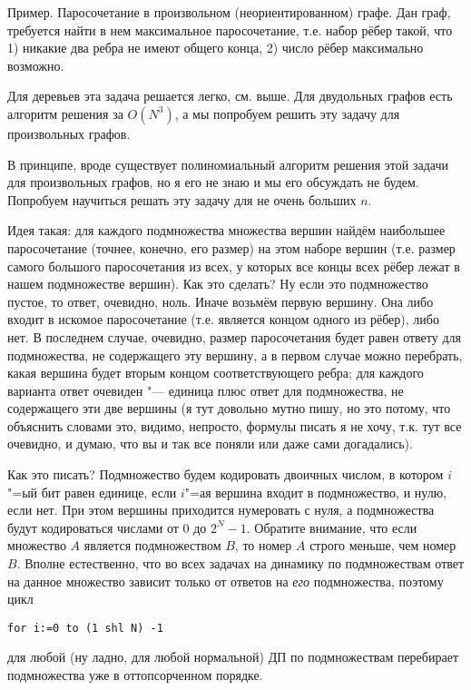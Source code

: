 Пример. Паросочетание в произвольном (неориентированном) графе. Дан граф, требуется найти в нем
максимальное паросочетание, т.е. набор рёбер такой, что 1) никакие два ребра не имеют общего конца, 2) число
рёбер максимально возможно.

Для деревьев эта задача решается легко, см. выше. Для двудольных графов есть алгоритм решения за $O(N^3)$, а мы попробуем решить эту задачу для произвольных графов.

В принципе, вроде существует полиномиальный алгоритм решения этой задачи для произвольных графов, но я его не знаю и мы его обсуждать не будем. Попробуем научиться
решать эту задачу для не очень больших $n$.

Идея такая: для каждого подмножества множества вершин найдём наибольшее паросочетание (точнее, конечно, его размер) на этом наборе
вершин (т.е. размер самого большого паросочетания из всех, у которых все концы всех рёбер лежат в нашем подмножестве вершин). Как это сделать? Ну если это подмножество пустое, то ответ, очевидно, ноль. Иначе возьмём
первую вершину. Она либо входит в искомое паросочетание (т.е. является концом одного из рёбер), либо
нет. В последнем случае, очевидно, размер паросочетания будет равен ответу для подмножества, не
содержащего эту вершину, а в первом случае можно перебрать, какая вершина будет вторым концом
соответствующего ребра; для каждого варианта ответ очевиден "--- единица плюс ответ для
подмножества, не содержащего эти две вершины (я тут довольно мутно пишу, но это потому, что
объяснить словами это, видимо, непросто, формулы писать я не хочу, т.к. тут все очевидно, и думаю,
что вы и так все поняли или даже сами догадались).

Как это писать? Подмножество будем кодировать двоичных числом, в котором $i$"=ый бит равен единице,
если $i$"=ая вершина входит в подмножество, и нулю, если нет. При этом вершины приходится нумеровать
с нуля, а подмножества будут кодироваться числами от 0 до $2^N-1$. Обратите внимание, что если 
множество $A$ является подмножеством $B$, то номер $A$ строго меньше, чем номер $B$. Вполне
естественно, что во всех задачах на динамику по подмножествам ответ на данное множество зависит
только от ответов на \textit{его} подмножества, поэтому цикл

\begin{codesampleo}\begin{verbatim}
for i:=0 to (1 shl N) -1
\end{verbatim}\end{codesampleo}
для любой (ну ладно, для любой нормальной) ДП по подмножествам перебирает подмножества уже в оттопсорченном порядке.

